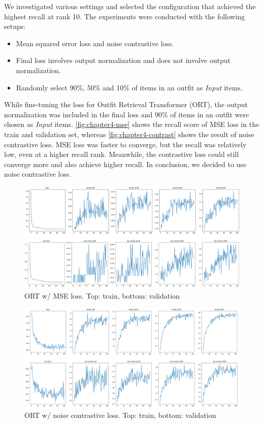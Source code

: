 We investigated various settings and selected the configuration that achieved the highest recall at rank 10. 
The experiments were conducted with the following setups:
\begin{itemize}
    \item Mean squared error loss and noise contrastive loss.
    \item Final loss involves output normalization and does not involve output normalization.
    \item Randomly select 90\%, 50\% and 10\% of items in an outfit as \textit{Input} items.
\end{itemize}

While fine-tuning the loss for Outfit Retrieval Transformer (ORT), the output normalization was included in the final loss and 90\% of items in an outfit were chosen as \textit{Input} items. \autoref{fig:chapter4-mse} shows the recall score of MSE loss in the train and validation set, whereas \autoref{fig:chapter4-contrast} shows the result of noise contrastive loss. MSE loss was faster to converge, but the recall was relatively low, even at a higher recall rank. Meanwhile, the contrastive loss could still converge more and also achieve higher recall. In conclusion, we decided to use noise contrastive loss.

\begin{figure}[ht!]
    \centering
    \includegraphics[width=\linewidth]{content/resources/images/fashion-recommendation/chapter4-mse.png}
    \caption{ORT w/ MSE loss. Top: train, bottom: validation}
    \label{fig:chapter4-mse}
\end{figure}

\begin{figure}[ht!]
    \centering
\includegraphics[width=\linewidth]{content/resources/images/fashion-recommendation/chapter4-contrast.png}
    \caption{ORT w/ noise contrastive loss. Top: train, bottom: validation}
    \label{fig:chapter4-contrast}
\end{figure}

